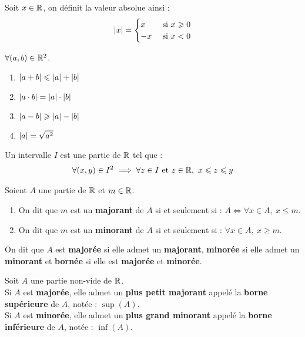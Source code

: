 \begin{definition}
    Soit $x \in \mathbb{R}$, on définit la valeur absolue ainsi :
    \begin{align*}
        \abs{x} =
        \begin{cases}
            x &\text{ si } x \geqslant 0 \\
            -x &\text{ si } x < 0
        \end{cases}
    \end{align*}
\end{definition}

\begin{proposition}
    $\forall (a, b) \in \mathbb{R}^2$.
    \begin{enumerate}
            \item $\abs{a + b} \leqslant \abs{a} + \abs{b}$
            \item $\abs{a \cdot b} = \abs{a} \cdot \abs{b}$
            \item $\abs{a - b} \geqslant \abs{a} - \abs{b}$
            \item $\abs{a} = \sqrt{a^2}$
        \end{enumerate}
\end{proposition}

\begin{definition}[Intervalle]
    Un intervalle $I$ est une partie de $\mathbb{R}$ tel que :
    \begin{align*}
        \forall (x, y) \in I^2 \implies \forall z \in I \text{ et } z \in \mathbb{R},\ x \leqslant z \leqslant y
    \end{align*}
\end{definition}

\begin{definition}
    Soient $A$ une partie de $\mathbb{R}$ et $m \in \mathbb{R}$.
    \begin{enumerate}
        \item On dit que $m$ est un \textbf{majorant} de $A$ si et seulement si : $A \iff \forall x \in A,\ x \leq m$.
        \item On dit que $m$ est un \textbf{minorant} de $A$ si et seulement si : $\forall x \in A,\ x \geq m$.
    \end{enumerate}
    On dit que $A$ est \textbf{majorée} si elle admet un \textbf{majorant}, \textbf{minorée} si elle admet un \textbf{minorant} et \textbf{bornée} si elle est \textbf{majorée} et \textbf{minorée}.
\end{definition}

\begin{theorem}
    Soit $A$ une partie non-vide de $\mathbb{R}$. \\
    Si $A$ est \textbf{majorée}, elle admet un \textbf{plus petit majorant} appelé la \textbf{borne supérieure} de $A$, notée : $\sup(A)$.
    \\
    Si $A$ est \textbf{minorée}, elle admet un \textbf{plus grand minorant} appelé la \textbf{borne inférieure} de $A$, notée : $\inf(A)$.
\end{theorem}

